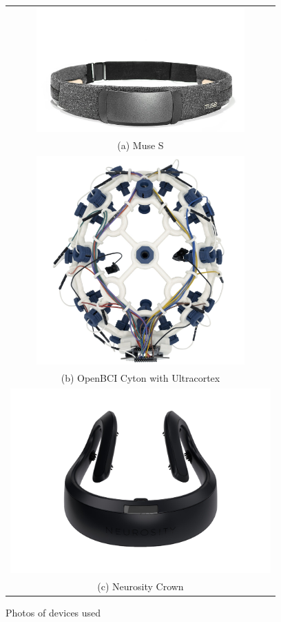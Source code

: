             \begin{figure}
                \centering
                \begin{tabular}{c}
                    \includegraphics[width=80mm]{img/Muse-S.jpg}
                    \\
                    (a) Muse S
                    \\[6pt]
                    \includegraphics[width=80mm]{img/openbci-cyton.jpg}
                    \\
                    (b) OpenBCI Cyton with Ultracortex
                    \\[6pt]
                    \includegraphics[trim=0 100 0 0,clip,width=100mm]{img/crown-1.png}
                    \\
                    (c) Neurosity Crown
                    \\[6pt]
                \end{tabular}
                \caption{Photos of devices used}
            \end{figure}

